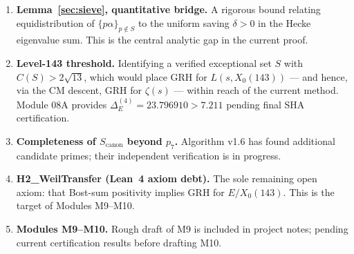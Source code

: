 \documentclass[11pt,letterpaper]{article}
\theoremstyle{definition}
\begin{document}
\begin{enumerate}
\item \textbf{Lemma~\ref{sec:sieve}, quantitative bridge.}
  A rigorous bound relating equidistribution of $\{p\alpha\}_{p \notin S}$
  to the uniform saving $\delta > 0$ in the Hecke eigenvalue sum.
  This is the central analytic gap in the current proof.

\item \textbf{Level-143 threshold.}
  Identifying a verified exceptional set $S$ with $C(S) > 2\sqrt{13}$,
  which would place GRH for $L(s, X_0(143))$ --- and hence, via the CM descent,
  GRH for $\zeta(s)$ --- within reach of the current method.
  Module 08A provides $\Delta_E^{(4)} = 23.796910 > 7.211$ pending final SHA certification.

\item \textbf{Completeness of $S_\mathrm{canon}$ beyond $p_7$.}
  Algorithm v1.6 has found additional candidate primes; their independent
  verification is in progress.

\item \textbf{H2\_WeilTransfer (Lean~4 axiom debt).}
  The sole remaining open axiom: that Bost-sum positivity implies GRH for
  $E/X_0(143)$.  This is the target of Modules M9--M10.

\item \textbf{Modules M9--M10.}
  Rough draft of M9 is included in project notes; pending current certification
  results before drafting M10.
\end{enumerate}
\end{document}
